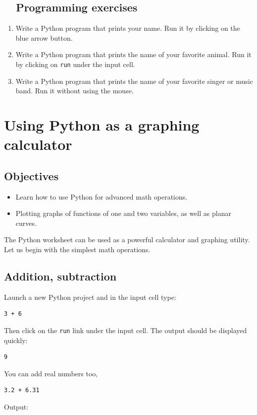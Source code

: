 \subsection{\ \ Programming exercises}

\begin{enumerate}
\item Write a Python program that prints your name. Run it by clicking on the blue arrow button.
\item Write a Python program that prints the name of your favorite animal. 
      Run it by clicking on {\tt run} under the input cell.
\item Write a Python program that prints the name of your favorite singer 
      or music band. Run it without using the mouse.
\end{enumerate}

\section{Using Python as a graphing calculator}

\subsection{Objectives}

\begin{itemize}
\item Learn how to use Python for advanced math operations.
\item Plotting graphs of functions of one and two variables, as well as planar curves.
\end{itemize}
The Python worksheet can be used as a powerful calculator and graphing utility. 
Let us begin with the simplest math operations.

\subsection{Addition, subtraction}

Launch a new Python project and in the input cell type:

\begin{verbatim}
3 + 6
\end{verbatim}
Then click on the {\tt run} link under the input cell. The output should be displayed quickly:

\begin{verbatim}
9
\end{verbatim}
You can add real numbers too,
\begin{verbatim}
3.2 + 6.31
\end{verbatim}
Output:

